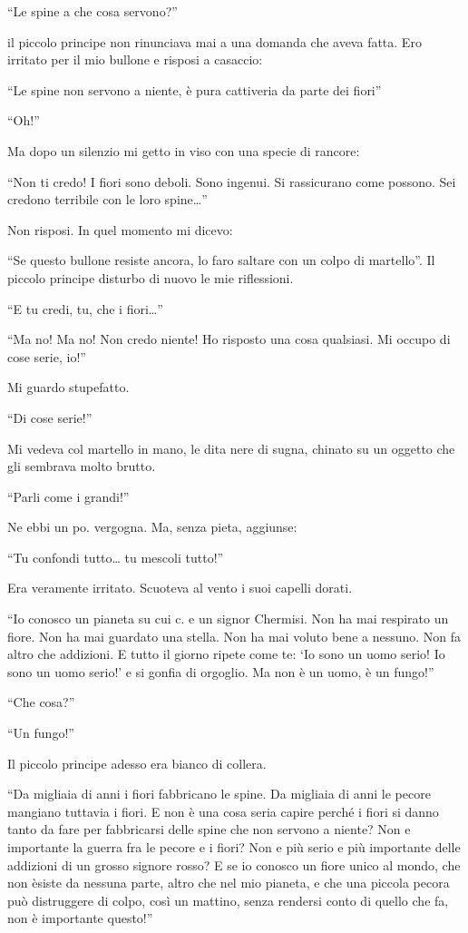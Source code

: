 \documentclass[11pt]{scrbook}
\begin{document}
``Le spine a che cosa servono?''

il piccolo principe non rinunciava mai a una domanda che aveva fatta.
Ero irritato per il mio bullone e risposi a casaccio:

``Le spine non servono a niente, è pura cattiveria da parte dei fiori''

``Oh!''

Ma dopo un silenzio mi getto in viso con una specie di rancore:

``Non ti credo! I fiori sono deboli. Sono ingenui. Si rassicurano come
possono. Sei credono terribile con le loro spine\ldots{}''

Non risposi. In quel momento mi dicevo:

``Se questo bullone resiste ancora, lo faro saltare con un colpo di
martello''. Il piccolo principe disturbo di nuovo le mie riflessioni.

``E tu credi, tu, che i fiori\ldots{}''

``Ma no! Ma no! Non credo niente! Ho risposto una cosa qualsiasi. Mi
occupo di cose serie, io!''

Mi guardo stupefatto.

``Di cose serie!''

Mi vedeva col martello in mano, le dita nere di sugna, chinato su un
oggetto che gli sembrava molto brutto.

``Parli come i grandi!''

Ne ebbi un po. vergogna. Ma, senza pieta, aggiunse:

``Tu confondi tutto\ldots{} tu mescoli tutto!''

Era veramente irritato. Scuoteva al vento i suoi capelli dorati.

``Io conosco un pianeta su cui c. e un signor Chermisi. Non ha mai
respirato un fiore. Non ha mai guardato una stella. Non ha mai voluto
bene a nessuno. Non fa altro che addizioni. E tutto il giorno ripete
come te: `Io sono un uomo serio! Io sono un uomo serio!' e si gonfia di
orgoglio. Ma non è un uomo, è un fungo!''

``Che cosa?''

``Un fungo!''

Il piccolo principe adesso era bianco di collera.

``Da migliaia di anni i fiori fabbricano le spine. Da migliaia di anni
le pecore mangiano tuttavia i fiori. E non è una cosa seria capire
perché i fiori si danno tanto da fare per fabbricarsi delle spine che
non servono a niente? Non e importante la guerra fra le pecore e i
fiori? Non e più serio e più importante delle addizioni di un grosso
signore rosso? E se io conosco un fiore unico al mondo, che non èsiste
da nessuna parte, altro che nel mio pianeta, e che una piccola pecora
può distruggere di colpo, così un mattino, senza rendersi conto di
quello che fa, non è importante questo!''
\end{document}

